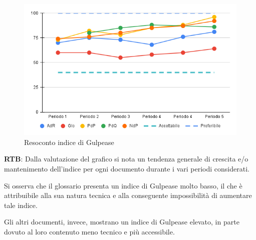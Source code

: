\vspace{0.3cm}

\begin{figure}[H]
    \centering
    \includegraphics[width=1\textwidth]{../Images/PianoDiQualifica/Gulpease.png}
    \caption{Resoconto indice di Gulpease}
    \label{fig:Indice di Gulpease}
\end{figure}

\vspace{0.2cm}

\textbf{RTB}: Dalla valutazione del grafico si nota un tendenza generale di crescita e/o mantenimento dell'indice per ogni documento durante i vari periodi considerati.

\vspace{0.2cm}

Si osserva che il glossario presenta un indice di Gulpease molto basso, il che è attribuibile alla sua natura tecnica e alla conseguente impossibilità di aumentare tale indice.

\vspace{0.2cm}

Gli altri documenti, invece, mostrano un indice di Gulpease elevato, in parte dovuto al loro contenuto meno tecnico e più accessibile.